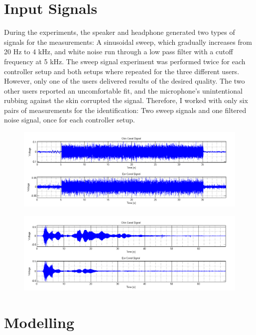 \section{Input Signals}

During the experiments, the speaker and headphone generated two types of signals for the measurements: A sinusoidal sweep, which gradually increases from 20 Hz to 4 kHz, and white noise run through a low pass filter with a cutoff frequency at 5 kHz. The sweep signal experiment was performed twice for each controller setup and both setups where repeated for the three different users. However, only one of the users delivered results of the desired quality. The two other users reported an uncomfortable fit, and the microphone's unintentional rubbing against the skin corrupted the signal. Therefore, I worked with only six pairs of measurements for the identification: Two sweep signals and one filtered noise signal, once for each controller setup.

\begin{figure}[H]
\centering
\includegraphics[width=1.0\textwidth]{pics/Noise}
\caption{}
\label{pic:}
\end{figure}

\begin{figure}[H]
\centering
\includegraphics[width=1.0\textwidth]{pics/Sweep}
\caption{}
\label{pic:}
\end{figure}

\section{Modelling}

